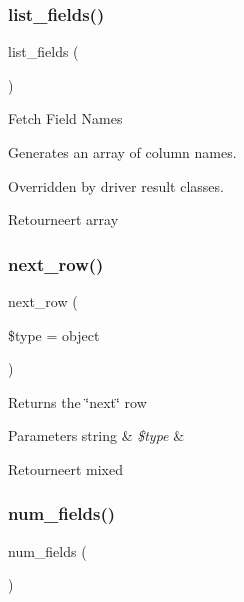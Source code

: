 \subsubsection{\texorpdfstring{list\_fields()}{list\_fields()}}
{\footnotesize\ttfamily list\+\_\+fields (\begin{DoxyParamCaption}{ }\end{DoxyParamCaption})}

Fetch Field Names

Generates an array of column names.

Overridden by driver result classes.

\begin{DoxyReturn}{Retourneert}
array 
\end{DoxyReturn}
\mbox{\label{class_c_i___d_b__result_a5664a519252b14c1cdd93d9de0322a9f}} 
\subsubsection{\texorpdfstring{next\_row()}{next\_row()}}
{\footnotesize\ttfamily next\+\_\+row (\begin{DoxyParamCaption}\item[{}]{\$type = {\ttfamily \textquotesingle{}object\textquotesingle{}} }\end{DoxyParamCaption})}

Returns the \char`\"{}next\char`\"{} row


\begin{DoxyParams}[1]{Parameters}
string & {\em \$type} & \\
\hline
\end{DoxyParams}
\begin{DoxyReturn}{Retourneert}
mixed 
\end{DoxyReturn}
\mbox{\label{class_c_i___d_b__result_af831bf363e4d7d661a717a4932af449d}} 
\subsubsection{\texorpdfstring{num\_fields()}{num\_fields()}}
{\footnotesize\ttfamily num\+\_\+fields (\begin{DoxyParamCaption}{ }\end{DoxyParamCaption})}

